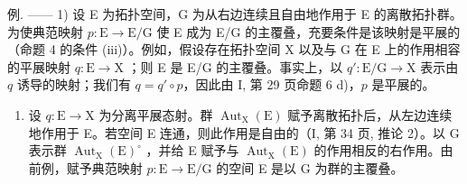 例. —— 1) 设 E 为拓扑空间，G 为从右边连续且自由地作用于 E 的离散拓扑群。为使典范映射 \(p \colon \mathrm{E} \to \mathrm{E} / \mathrm{G}\) 使 E 成为 E/G 的主覆叠，充要条件是该映射是平展的（命题 4 的条件 (iii)）。例如，假设存在拓扑空间 X 以及与 G 在 E 上的作用相容的平展映射 \(q \colon \mathrm{E} \to \mathrm{X}\) ；则 E 是 E/G 的主覆叠。事实上，以 \(q' \colon \mathrm{E} / \mathrm{G} \to \mathrm{X}\) 表示由 \(q\) 诱导的映射；我们有 \(q = q' \circ p\)，因此由 I, 第 29 页命题 6 d)，\(p\) 是平展的。

\begin{enumerate}
\def\labelenumi{\arabic{enumi})}
\setcounter{enumi}{1}
\tightlist
\item
  设 \(q \colon \mathrm{E} \to \mathrm{X}\) 为分离平展态射。群 \(\operatorname{Aut}_{\mathrm{X}}(\mathrm{E})\) 赋予离散拓扑后，从左边连续地作用于 E。若空间 E 连通，则此作用是自由的（I, 第 34 页, 推论 2）。以 G 表示群 \(\operatorname{Aut}_{\mathrm{X}}(\mathrm{E})^{\circ}\) ，并给 E 赋予与 \(\operatorname{Aut}_{\mathrm{X}}(\mathrm{E})\) 的作用相反的右作用。由前例，赋予典范映射 \(p \colon \mathrm{E} \to \mathrm{E} / \mathrm{G}\) 的空间 E 是以 G 为群的主覆叠。
\end{enumerate}

